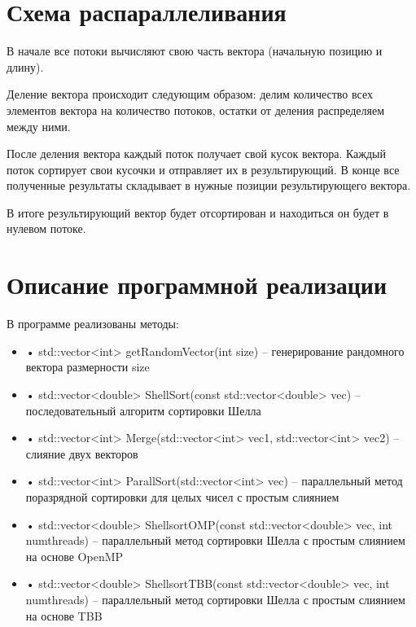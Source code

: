 \documentclass{report}
\begin{document}
\section*{Схема распараллеливания}
В начале все потоки вычисляют свою часть вектора (начальную позицию и длину).  
\par
Деление вектора происходит следующим образом: делим количество всех элементов вектора на количество потоков, остатки от деления распределяем между ними.
\par
После деления вектора каждый поток получает свой кусок вектора. Каждый поток сортирует свои кусочки и отправляет их в результирующий. В конце все полученные результаты складывает в нужные позиции результирующего вектора.
\par
В итоге результирующий вектор будет отсортирован и находиться он будет в нулевом потоке.
\newpage

\section*{Описание программной реализации}
В программе реализованы методы:
\begin{itemize}
\item[]•	std::vector<int> getRandomVector(int size) – генерирование рандомного вектора размерности size
\end{itemize}
\begin{itemize}
\item[]•	std::vector<double> ShellSort(const std::vector<double> vec) – последовательный алгоритм 
сортировки Шелла
\end{itemize}
\begin{itemize}
\item[]•	std::vector<int> Merge(std::vector<int> vec1, std::vector<int> vec2) – слияние двух векторов
\end{itemize}
\begin{itemize}
\item[]•	std::vector<int> ParallSort(std::vector<int> vec) – параллельный метод поразрядной сортировки для целых чисел с простым слиянием
\end{itemize}
\begin{itemize}
\item[]•	std::vector<double> ShellsortOMP(const std::vector<double> vec, int numthreads)  – параллельный метод сортировки Шелла с простым слиянием на основе OpenMP
\end{itemize}
\begin{itemize}
\item[]•	std::vector<double> ShellsortTBB(const std::vector<double> vec, int numthreads)  – параллельный метод сортировки Шелла с простым слиянием на основе TBB
\end{itemize}
\newpage
\end{document}

